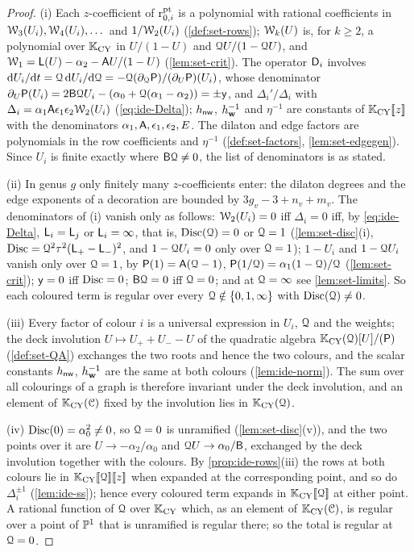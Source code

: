 \begin{proof}
(i) Each $z$-coefficient of $\mathrm{r}^{\mathrm{pt}}_{0,i}$ is a polynomial with rational coefficients in $\mathcal{W}_3(U_i),\mathcal{W}_4(U_i),\dots$ and $1/\mathcal{W}_2(U_i)$ (\cref{def:set-rows}); $\mathcal{W}_k(U)$ is, for $k\geq 2$, a polynomial over $\mathbb{K}_{\mathrm{CY}}$ in $U/(1-U)$ and $\mathcal{Q} U/(1-\mathcal{Q} U)$, and $\mathcal{W}_1=\mathsf{L}(U)-\alpha_2-\mathsf{A} U/(1-U)$ (\cref{lem:set-crit}). The operator $\mathsf{D}_i$ involves $\mathrm{d} U_i/\mathrm{d} t=\mathcal{Q}\,\mathrm{d} U_i/\mathrm{d}\mathcal{Q}=-\mathcal{Q}(\partial_{\mathcal{Q}}\mathsf{P})/(\partial_U\mathsf{P})(U_i)$, whose denominator $\partial_U\mathsf{P}(U_i)=2\mathsf{B}\mathcal{Q} U_i-(\alpha_0+\mathcal{Q}(\alpha_1-\alpha_2))=\pm\mathsf{y}$, and $\Delta_i'/\Delta_i$ with $\Delta_i=\alpha_1\mathsf{A}\epsilon_1\epsilon_2\mathcal{W}_2(U_i)$ (\cref{eq:ide-Delta}); $h_{\mathsf{nw}}$, $h_{\mathbf{w}}^{-1}$ and $\eta^{-1}$ are constants of $\mathbb{K}_{\mathrm{CY}}[\![ z ]\!]$ with the denominators $\alpha_1,\mathsf{A},\epsilon_1,\epsilon_2,E$. The dilaton and edge factors are polynomials in the row coefficients and $\eta^{-1}$ (\cref{def:set-factors}, \cref{lem:set-edgegen}). Since $U_i$ is finite exactly where $\mathsf{B}\mathcal{Q}\neq 0$, the list of denominators is as stated.

(ii) In genus $g$ only finitely many $z$-coefficients enter: the dilaton degrees and the edge exponents of a decoration are bounded by $3g_v-3+n_v+m_v$. The denominators of (i) vanish only as follows: $\mathcal{W}_2(U_i)=0$ iff $\Delta_i=0$ iff, by \cref{eq:ide-Delta}, $\mathsf{L}_i=\mathsf{L}_j$ or $\mathsf{L}_i=\infty$, that is, $\operatorname{Disc}(\mathcal{Q})=0$ or $\mathcal{Q}=1$ (\cref{lem:set-disc}(i), $\operatorname{Disc}=\mathcal{Q}^2\tau^2(\mathsf{L}_+-\mathsf{L}_-)^2$, and $1-\mathcal{Q} U_i=0$ only over $\mathcal{Q}=1$); $1-U_i$ and $1-\mathcal{Q} U_i$ vanish only over $\mathcal{Q}=1$, by $\mathsf{P}(1)=\mathsf{A}(\mathcal{Q}-1)$, $\mathsf{P}(1/\mathcal{Q})=\alpha_1(1-\mathcal{Q})/\mathcal{Q}$ (\cref{lem:set-crit}); $\mathsf{y}=0$ iff $\operatorname{Disc}=0$; $\mathsf{B}\mathcal{Q}=0$ iff $\mathcal{Q}=0$; and at $\mathcal{Q}=\infty$ see \cref{lem:set-limits}. So each coloured term is regular over every $\mathcal{Q}\notin\{0,1,\infty\}$ with $\operatorname{Disc}(\mathcal{Q})\neq 0$.

(iii) Every factor of colour $i$ is a universal expression in $U_i$, $\mathcal{Q}$ and the weights; the deck involution $U\mapsto U_++U_--U$ of the quadratic algebra $\mathbb{K}_{\mathrm{CY}}(\mathcal{Q})[U]/(\mathsf{P})$ (\cref{def:set-QA}) exchanges the two roots and hence the two colours, and the scalar constants $h_{\mathsf{nw}}$, $h_{\mathbf{w}}^{-1}$ are the same at both colours (\cref{lem:ide-norm}). The sum over all colourings of a graph is therefore invariant under the deck involution, and an element of $\mathbb{K}_{\mathrm{CY}}(\mathcal{C})$ fixed by the involution lies in $\mathbb{K}_{\mathrm{CY}}(\mathcal{Q})$.

(iv) $\operatorname{Disc}(0)=\alpha_0^2\neq 0$, so $\mathcal{Q}=0$ is unramified (\cref{lem:set-disc}(v)), and the two points over it are $U\to-\alpha_2/\alpha_0$ and $\mathcal{Q} U\to\alpha_0/\mathsf{B}$, exchanged by the deck involution together with the colours. By \cref{prop:ide-rows}(iii) the rows at both colours lie in $\mathbb{K}_{\mathrm{CY}}[\![ \mathcal{Q} ]\!][\![ z ]\!]$ when expanded at the corresponding point, and so do $\Delta_i^{\pm1}$ (\cref{lem:ide-ss}); hence every coloured term expands in $\mathbb{K}_{\mathrm{CY}}[\![ \mathcal{Q} ]\!]$ at either point. A rational function of $\mathcal{Q}$ over $\mathbb{K}_{\mathrm{CY}}$ which, as an element of $\mathbb{K}_{\mathrm{CY}}(\mathcal{C})$, is regular over a point of $\mathbb{P}^1$ that is unramified is regular there; so the total is regular at $\mathcal{Q}=0$.
\end{proof}

